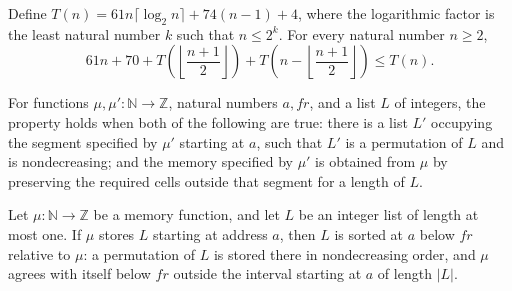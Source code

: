 \begin{theorem}
\label{Light.MergeSort.time_split}
\leanok
{}
Define $T(n)=61n\lceil\log_2 n\rceil+74(n-1)+4$, where the logarithmic factor is the
least natural number $k$ such that $n\le 2^k$. For every natural number $n\ge2$,
$$61n+70+T\!\left(\left\lfloor\frac{n+1}{2}\right\rfloor\right)+T\!\left(n-\left\lfloor\frac{n+1}{2}\right\rfloor\right)\le
T(n).$$
\end{theorem}

\begin{definition}
\label{Light.MergeSort.Sorted}
\leanok
{}
For functions $\mu,\mu':\mathbb{N}\to\mathbb{Z}$, natural numbers $a,fr$, and a list $L$
of integers, the property holds when both of the following are true: there is a list
$L'$ occupying the segment specified by $\mu'$ starting at $a$, such that $L'$ is a
permutation of $L$ and is nondecreasing; and the memory specified by $\mu'$ is obtained
from $\mu$ by preserving the required cells outside that segment for a length of $L$.
\end{definition}

\begin{theorem}
\label{Light.MergeSort.sorted_refl}
\leanok
{}
Let $\mu:\mathbb{N}\to\mathbb{Z}$ be a memory function, and let $L$ be an integer list
of length at most one. If $\mu$ stores $L$ starting at address $a$, then $L$ is sorted
at $a$ below $fr$ relative to $\mu$: a permutation of $L$ is stored there in
nondecreasing order, and $\mu$ agrees with itself below $fr$ outside the interval
starting at $a$ of length $|L|$.
\end{theorem}

